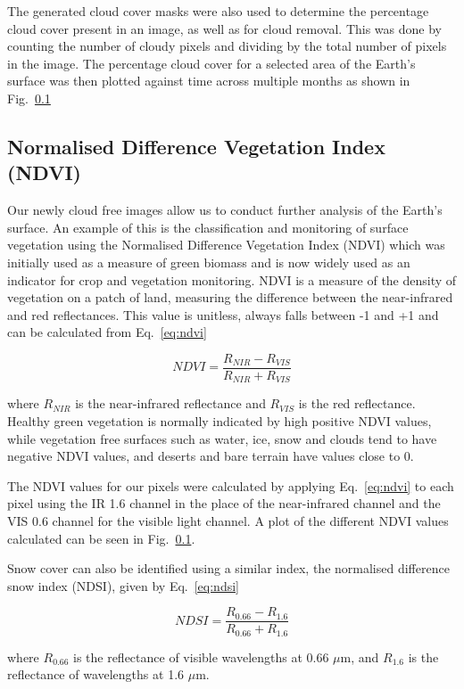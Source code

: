 The generated cloud cover masks were also used to determine the percentage cloud cover present in an image, as well as for cloud removal. This was done by counting the number of cloudy pixels and dividing by the total number of pixels in the image. The percentage cloud cover for a selected area of the Earth's surface was then plotted against time across multiple months as shown in Fig.~\ref{}

\subsection{Normalised Difference Vegetation Index (NDVI)}
Our newly cloud free images allow us to conduct further analysis of the Earth's surface. An example of this is the classification and monitoring of surface vegetation using the Normalised Difference Vegetation Index (NDVI) which was initially used as a measure of green biomass and is now widely used as an indicator for crop and vegetation monitoring. NDVI is a measure of the density of vegetation on a patch of land, measuring the difference between the near-infrared and red reflectances. This value is unitless,  always falls between -1 and +1 and can be calculated from Eq.~\ref{eq:ndvi}

\begin{equation}\label{eq:ndvi}
    NDVI = \frac{R_{NIR}-R_{VIS}}{R_{NIR}+R_{VIS}}
\end{equation}


where $R_{NIR}$ is the near-infrared reflectance and $R_{VIS}$ is the red reflectance.
Healthy green vegetation is normally indicated by high positive NDVI values, while vegetation free surfaces such as water, ice, snow and clouds tend to have negative NDVI values, and deserts and bare terrain have values close to 0.

The NDVI values for our pixels were calculated by applying Eq.~\ref{eq:ndvi} to each pixel using the IR 1.6 channel in the place of the near-infrared channel and the VIS 0.6 channel for the visible light channel. A plot of the different NDVI values calculated can be seen in Fig.~\ref{}.

\par Snow cover can also be identified using a similar index, the normalised difference snow index (NDSI), given by Eq.~\ref{eq:ndsi}

\begin{equation}\label{eq:ndsi}
    NDSI = \frac{R_{0.66}-R_{1.6}}{R_{0.66}+R_{1.6}}
\end{equation}

where $R_{0.66}$ is the reflectance of visible wavelengths at 0.66 $\mu$m, and $R_{1.6}$ is the reflectance of wavelengths at 1.6 $\mu$m.





